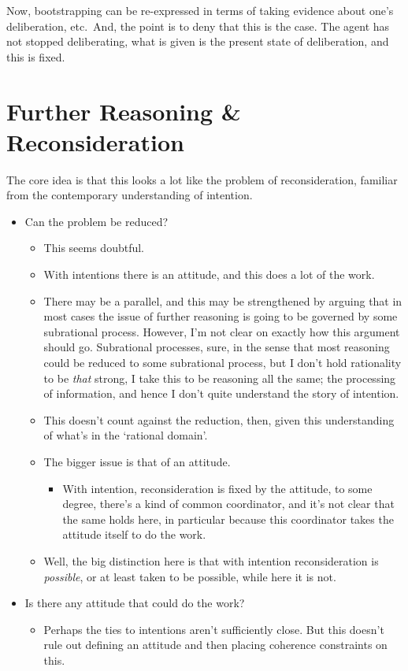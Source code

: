 \documentclass[10pt]{article}
\begin{document}
Now, bootstrapping can be re-expressed in terms of taking evidence about one's deliberation, etc.\
And, the point is to deny that this is the case.
The agent has not stopped deliberating, what is given is the present state of deliberation, and this is fixed.

\newpage

\section{Further Reasoning \& Reconsideration}
\label{sec:further-reasoning-}

The core idea is that this looks a lot like the problem of reconsideration, familiar from the contemporary understanding of intention.

\begin{itemize}
\item Can the problem be reduced?
  \begin{itemize}
  \item This seems doubtful.
  \item With intentions there is an attitude, and this does a lot of the work.
  \item There may be a parallel, and this may be strengthened by arguing that in most cases the issue of further reasoning is going to be governed by some subrational process.
    However, I'm not clear on exactly how this argument should go.
    Subrational processes, sure, in the sense that most reasoning could be reduced to some subrational process, but I don't hold rationality to be \emph{that} strong, I take this to be reasoning all the same; the processing of information, and hence I don't quite understand the story of intention.
  \item This doesn't count against the reduction, then, given this understanding of what's in the `rational domain'.
  \item The bigger issue is that of an attitude.
    \begin{itemize}
    \item With intention, reconsideration is fixed by the attitude, to some degree, there's a kind of common coordinator, and it's not clear that the same holds here, in particular because this coordinator takes the attitude itself to do the work.
    \end{itemize}
  \item Well, the big distinction here is that with intention reconsideration is \emph{possible}, or at least taken to be possible, while here it is not.
  \end{itemize}
\item Is there any attitude that could do the work?
  \begin{itemize}
  \item Perhaps the ties to intentions aren't sufficiently close.
    But this doesn't rule out defining an attitude and then placing coherence constraints on this.
  \end{itemize}
\end{itemize}
\end{document}
